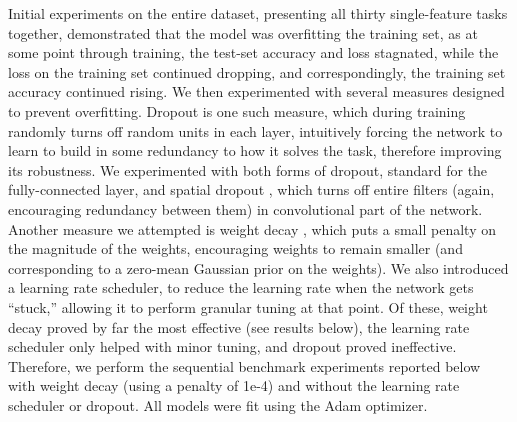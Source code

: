 Initial experiments on the entire dataset, presenting all thirty single-feature tasks together, demonstrated that the model was overfitting the training set, as at some point through training, the test-set accuracy and loss stagnated, while the loss on the training set continued dropping, and correspondingly, the training set accuracy continued rising. We then experimented with several measures designed to prevent overfitting. Dropout is one such measure, which during training randomly turns off random units in each layer, intuitively forcing the network to learn to build in some redundancy to how it solves the task, therefore improving its robustness. We experimented with both forms of dropout, standard \parencite{Srivastava2014} for the fully-connected layer, and spatial dropout \parencite{Tompson2015}, which turns off entire filters (again, encouraging redundancy between them) in convolutional part of the network. Another measure we attempted is weight decay \parencite{Krogh1992}, which puts a small penalty on the magnitude of the weights, encouraging weights to remain smaller (and corresponding to a zero-mean Gaussian prior on the weights). We also introduced a learning rate scheduler, to reduce the learning rate when the network gets ``stuck,'' allowing it to perform granular tuning at that point. Of these, weight decay proved by far the most effective (see results below), the learning rate scheduler only helped with minor tuning, and dropout proved ineffective. Therefore, we perform the sequential benchmark experiments reported below with weight decay (using a penalty of 1e-4) and without the learning rate scheduler or dropout. All models were fit using the Adam \parencite{Kingma2015} optimizer.
